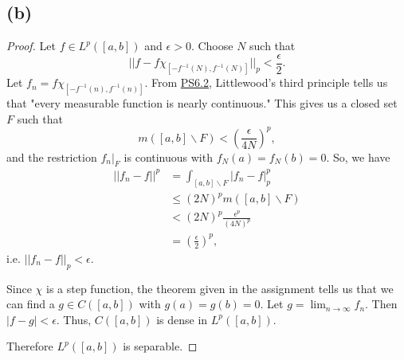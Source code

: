 \documentclass{article}
\begin{document}
\subsection*{(b)}
\begin{proof}
	Let $f \in L^p([a, b])$ and $\epsilon > 0$. Choose $N$ such that
	\begin{equation}
		||f - f \chi_{[-f^{-1}(N), f^{-1}(N)]}||_p < \frac{\epsilon}{2}.
	\end{equation}
	Let $f_n =f \chi_{[-f^{-1}(n), f^{-1}(n)]}$. From \href{https://github.com/ovega14/FunctionalAnalysis_solutions/blob/main/PS6/18.102_ps6.pdf}{PS6.2}, Littlewood's third principle tells us that "every measurable function is nearly continuous." This gives us a closed set $F$ such that
	\begin{equation}
		m([a, b] \backslash F) < \left(\frac{\epsilon}{4N}\right)^p,
	\end{equation}
	and the restriction $f_n \big|_F$ is continuous with $f_N(a) = f_N(b) = 0$. So, we have
	\begin{align}
		||f_n - f||^p &= \int_{[a, b] \backslash F} |f_n - f|_p ^p \\
		& \leq (2N)^p m([a, b]\backslash F) \\
		&< (2N)^p \frac{\epsilon^p}{(4N)^p} \\
		&= \left(\frac{\epsilon}{2} \right)^p,
	\end{align}
	i.e. $||f_n - f||_p < \epsilon$.
	
	Since $\chi$ is a step function, the theorem given in the assignment tells us that we can find a $g \in C([a, b])$ with $g(a) = g(b) = 0$. Let $g = \lim_{n \to \infty} f_n$. Then $|f - g| < \epsilon$. Thus, $C([a, b])$ is dense in $L^p([a, b])$.
	
	Therefore $L^p([a, b])$ is separable.
\end{proof}
	
\end{document}
